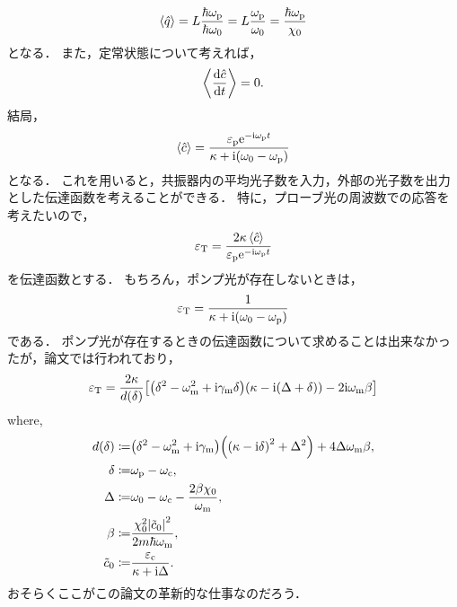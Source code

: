       \begin{align}
        \ev{\hat{q}} = L\frac{\hbar\omega_{\r{p}}}{\hbar\omega_0} = L\frac{\omega_{\r{p}}}{\omega_0} = \frac{\hbar\omega_{\r{p}}}{\chi_0}
      \end{align}
      となる．
      また，定常状態について考えれば，
      \begin{align}
        \ev{\dv{\hat{c}}{t}} = 0.
      \end{align}
      結局，
      \begin{align}
        \ev{\hat{c}} = \frac{\epsilon_{\r{p}}\e^{-\i\omega_{\r{p}}t}}{\kappa + \i\qty(\omega_0 - \omega_{\r{p}})}
      \end{align}
      となる．
      これを用いると，共振器内の平均光子数を入力，外部の光子数を出力とした伝達函数を考えることができる．
      特に，プローブ光の周波数での応答を考えたいので，
      \begin{align}
        \epsilon_{\r{T}} = \frac{2\kappa\ev{\hat{c}}}{\epsilon_{\r{p}}\e^{-\i\omega_{\r{p}}t}}
      \end{align}
      を伝達函数とする．
      もちろん，ポンプ光が存在しないときは，
      \begin{align}
        \varepsilon_{\mathrm{T}} = \frac{1}{\kappa + \mathrm{i}\qty(\omega_0 - \omega_{\mathrm{p}})}
      \end{align}
      である．
      ポンプ光が存在するときの伝達函数について求めることは出来なかったが，論文では行われており，
      \begin{align}
        \varepsilon_{\mathrm{T}} = \frac{2\kappa}{d(\delta)}\qty[\qty(\delta^2 - \omega^2_{\mathrm{m}} + \mathrm{i}\gamma_{\mathrm{m}}\delta)\qty(\kappa - \mathrm{i}\qty(\Delta + \delta)) - 2\mathrm{i}\omega_{\mathrm{m}}\beta] \\ 
      \end{align}
      where,
      \begin{align}
        d(\delta) \coloneqq& \qty(\delta^2 - \omega^2_{\mathrm{m}} + \mathrm{i}\gamma_{\mathrm{m}})\qty(\qty(\kappa - \mathrm{i}\delta)^2 + \Delta^2) + 4\Delta\omega_{\mathrm{m}}\beta, \\ 
        \delta \coloneqq& \omega_{\mathrm{p}} - \omega_{\mathrm{c}}, \\ 
        \Delta \coloneqq& \omega_0 - \omega_{\mathrm{c}} - \frac{2\beta\chi_0}{\omega_{\mathrm{m}}}, \\ 
        \beta \coloneqq& \frac{\chi^2_0\abs{\tilde{c}_0}^2}{2m\hbar\omega_{\mathrm{m}}}, \\ 
        \tilde{c}_0 \coloneqq& \frac{\varepsilon_{\mathrm{c}}}{\kappa + \mathrm{i}\Delta}.
      \end{align}
      おそらくここがこの論文の革新的な仕事なのだろう．
